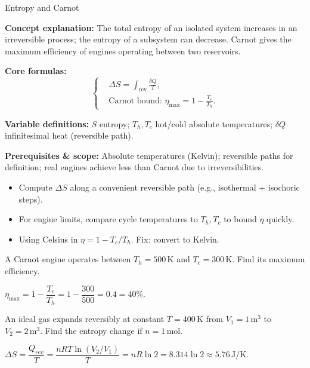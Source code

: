 \begin{KnowledgePoint}{Entropy and Carnot \Core}
  \KPFormulas
  \begin{formulabox}
  \textbf{Concept explanation:} The total entropy of an isolated system increases in an irreversible process; the entropy of a subsystem can decrease. Carnot gives the maximum efficiency of engines operating between two reservoirs.

  \textbf{Core formulas:}
  \[
  \left\{\begin{aligned}
    &\Delta S=\int_{\text{rev}} \frac{\delta Q}{T},\\
    &\text{Carnot bound: } \eta_{\max}=1-\frac{T_c}{T_h}.
  \end{aligned}\right.
  \]

  \textbf{Variable definitions:} $S$ entropy; $T_h,T_c$ hot/cold absolute temperatures; $\delta Q$ infinitesimal heat (reversible path).

  

  \textbf{Prerequisites \& scope:} Absolute temperatures (Kelvin); reversible paths for definition; real engines achieve less than Carnot due to irreversibilities.
  \end{formulabox}

  \KPHeuristics
  \begin{heuristicsbox}
  \begin{itemize}[leftmargin=*]
    \item Compute $\Delta S$ along a convenient reversible path (e.g., isothermal + isochoric steps).
    \item For engine limits, compare cycle temperatures to $T_h,T_c$ to bound $\eta$ quickly.
  \end{itemize}
  \vspace{0.4em}
  \begin{itemize}[leftmargin=*]
    \item Using Celsius in $\eta=1-T_c/T_h$. Fix: convert to Kelvin.
  \end{itemize}
  \end{heuristicsbox}

  \KPProblems
\begin{cheatproblem}
  A Carnot engine operates between $T_h=500\,\text{K}$ and $T_c=300\,\text{K}$. Find its maximum efficiency.
\begin{solutionbox}
  $\eta_{\max}=1-\dfrac{T_c}{T_h}=1-\dfrac{300}{500}=0.4=40\%$.
\end{solutionbox}
\end{cheatproblem}
\begin{cheatproblem}
  An ideal gas expands reversibly at constant $T=400\,\text{K}$ from $V_1=1\,\text{m}^3$ to $V_2=2\,\text{m}^3$. Find the entropy change if $n=1\,\text{mol}$.
\begin{solutionbox}
  $\Delta S=\dfrac{Q_{rev}}{T}=\dfrac{nRT\ln(V_2/V_1)}{T}=nR\ln2=8.314\ln2\approx5.76\,\text{J/K}$.
\end{solutionbox}
\end{cheatproblem}
\end{KnowledgePoint}

